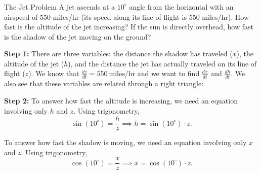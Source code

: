 \documentclass[cal1spr16Lectures.tex]{subfiles}
\begin{document}
\begin{frame}
\frametitle{}
\begin{block}{The Jet Problem}
A jet ascends at a $10^{\circ}$ angle from the horizontal with an airspeed of 550 miles/hr (its speed along its line of flight is 550 miles/hr).  How fast is the altitude of the jet increasing?  If the sun is directly overhead, how fast is the shadow of the jet moving on the ground?
\end{block}
\end{frame}

\begin{frame}
\small
{\bf Step 1:}  There are three variables:  the distance the shadow has traveled ($x$), the altitude of the jet ($h$), and the distance the jet has actually traveled on its line of flight ($z$).  We know that $\textstyle\frac{dz}{dt}=550\ \text{miles/hr}$ and we want to find $\textstyle\frac{dx}{dt}$ and $\textstyle\frac{dh}{dt}$.  We also see that these variables are related through a right triangle:
\begin{center}
\end{center}
\end{frame}

\begin{frame}
\small
{\bf Step 2:}  To answer how fast the altitude is increasing, we need an equation involving only $h$ and $z$.  Using trigonometry,
\[\sin(10^{\circ})=\frac{h}{z} \implies h=\sin(10^{\circ}) \cdot z.\]

\vspace{1pc}
To answer how fast the shadow is moving, we need an equation involving only $x$ and $z$.  Using trigonometry,
\[\cos(10^{\circ})=\frac{x}{z} \implies x=\cos(10^{\circ}) \cdot z.\]
\end{frame}
\end{document}
